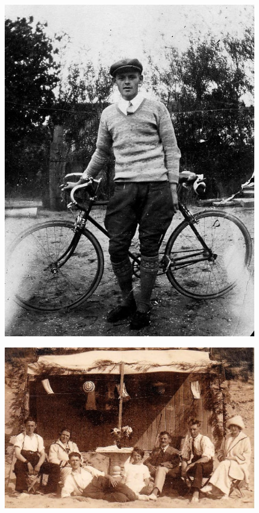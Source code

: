 \documentclass[12pt,twoside, openright]{memoir}
\begin{document}
\begin{figure}
\centering
\includegraphics[width=\textwidth]{img/29coppi}
\caption*{\footnotesize }
\end{figure}

\begin{figure}
\centering
\includegraphics[width=\textwidth]{img/30Heemskerk}
\caption*{\footnotesize }
\end{figure}
\end{document}
